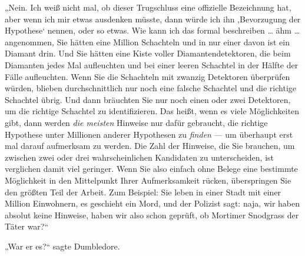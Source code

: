 „Nein. Ich weiß nicht mal, ob dieser Trugschluss eine offizielle Bezeichnung hat, aber wenn ich mir etwas ausdenken müsste, dann würde ich ihn ‚Bevorzugung der Hypothese‘ nennen, oder so etwas. Wie kann ich das formal beschreiben … ähm … angenommen, Sie hätten eine Million Schachteln und in nur einer davon ist ein Diamant drin. Und Sie hätten eine Kiste voller Diamantendetektoren, die beim Diamanten jedes Mal aufleuchten und bei einer leeren Schachtel in der Hälfte der Fälle aufleuchten. Wenn Sie die Schachteln mit zwanzig Detektoren überprüfen würden, blieben durchschnittlich nur noch eine falsche Schachtel und die richtige Schachtel übrig. Und dann bräuchten Sie nur noch einen oder zwei Detektoren, um die richtige Schachtel zu identifizieren. Das heißt, wenn es viele Möglichkeiten gibt, dann werden \emph{die meisten} Hinweise nur dafür gebraucht, die richtige Hypothese unter Millionen anderer Hypothesen zu \emph{finden} — um überhaupt erst mal darauf aufmerksam zu werden. Die Zahl der Hinweise, die Sie brauchen, um zwischen zwei oder drei wahrscheinlichen Kandidaten zu unterscheiden, ist verglichen damit viel geringer. Wenn Sie also einfach ohne Belege eine bestimmte Möglichkeit in den Mittelpunkt Ihrer Aufmerksamkeit rücken, überspringen Sie den größten Teil der Arbeit. Zum Beispiel: Sie leben in einer Stadt mit einer Million Einwohnern, es geschieht ein Mord, und der Polizist sagt: naja, wir haben absolut keine Hinweise, haben wir also schon geprüft, ob Mortimer Snodgrass der Täter war?“

„War er es?“ sagte Dumbledore.


